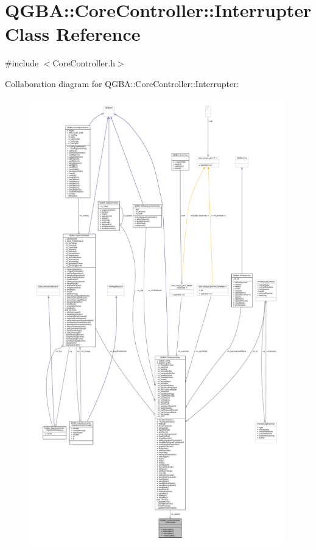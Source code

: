 \hypertarget{class_q_g_b_a_1_1_core_controller_1_1_interrupter}{}\section{Q\+G\+BA\+:\+:Core\+Controller\+:\+:Interrupter Class Reference}
\label{class_q_g_b_a_1_1_core_controller_1_1_interrupter}


{\ttfamily \#include $<$Core\+Controller.\+h$>$}



Collaboration diagram for Q\+G\+BA\+:\+:Core\+Controller\+:\+:Interrupter\+:
\nopagebreak
\begin{figure}[H]
\begin{center}
\leavevmode
\includegraphics[height=550pt]{class_q_g_b_a_1_1_core_controller_1_1_interrupter__coll__graph}
\end{center}
\end{figure}
